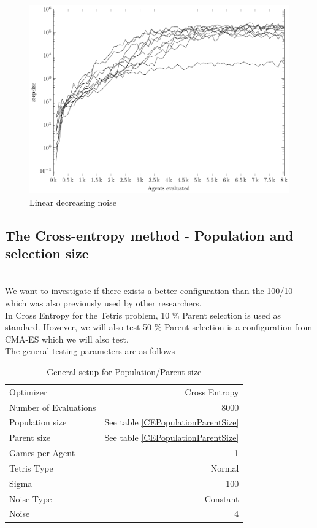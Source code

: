 \begin{figure}[H]
\begin{center}
\includegraphics[scale=0.48]{plots/linearNoisePlot}
\end{center}
\caption{Linear decreasing noise}
\end{figure}


\clearpage

\subsection{The Cross-entropy method - Population and selection size \label{appendixCrossEntropyConfig}}
\\
We want to investigate if there exists a better configuration than the 100/10 which was also previously used by other researchers.\\
In Cross Entropy for the Tetris problem, 10 \% Parent selection is used as standard. However, we will also test 50 \% Parent selection is a configuration from CMA-ES which we will also test.\\
The general testing parameters are as follows
\begin{table}[h]
\centering
\begin{tabular}{l r}
Optimizer & Cross Entropy\\
Number of Evaluations & 8000\\
Population size & See table \ref{CEPopulationParentSize}\\
Parent size & See table \ref{CEPopulationParentSize}\\
Games per Agent & 1\\
Tetris Type & Normal\\
\hline
Sigma & 100\\
Noise Type & Constant\\
Noise & 4
\end{tabular}
\caption{General setup for Population/Parent size}
\end{table}

